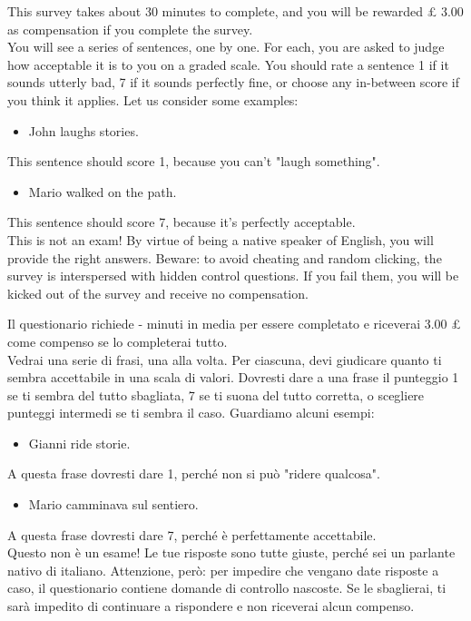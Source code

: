 \begin{kaobox}[frametitle=Instructions for the English survey]
This survey takes about 30 minutes to complete, and you will be rewarded £ 3.00 as compensation if you complete the survey.\\
You will see a series of sentences, one by one. For each, you are asked to judge how acceptable it is to you on a graded scale. You should rate a sentence 1 if it sounds utterly bad, 7 if it sounds perfectly fine, or choose any in-between score if you think it applies. Let us consider some examples:
\begin{itemize}
    \item John laughs stories.
\end{itemize}
This sentence should score 1, because you can't "laugh something".
\begin{itemize}
    \item Mario walked on the path.
\end{itemize}
This sentence should score 7, because it's perfectly acceptable.\\
This is not an exam! By virtue of being a native speaker of English, you will provide the right answers. Beware: to avoid cheating and random clicking, the survey is interspersed with hidden control questions. If you fail them, you will be kicked out of the survey and receive no compensation.
\end{kaobox}

\begin{kaobox}[frametitle=Instructions for the Italian survey]
Il questionario richiede - minuti in media per essere completato e riceverai 3.00 £ come compenso se lo completerai tutto.\\
Vedrai una serie di frasi, una alla volta. Per ciascuna, devi giudicare quanto ti sembra accettabile in una scala di valori. Dovresti dare a una frase il punteggio 1 se ti sembra del tutto sbagliata, 7 se ti suona del tutto corretta, o scegliere punteggi intermedi se ti sembra il caso. Guardiamo alcuni esempi:
\begin{itemize}
    \item Gianni ride storie.
\end{itemize}
A questa frase dovresti dare 1, perché non si può "ridere qualcosa".
\begin{itemize}
    \item Mario camminava sul sentiero.
\end{itemize}
A questa frase dovresti dare 7, perché è perfettamente accettabile.\\
Questo non è un esame! Le tue risposte sono tutte giuste, perché sei un parlante nativo di italiano. Attenzione, però: per impedire che vengano date risposte a caso, il questionario contiene domande di controllo nascoste. Se le sbaglierai, ti sarà impedito di continuare a rispondere e non riceverai alcun compenso.
\end{kaobox}

